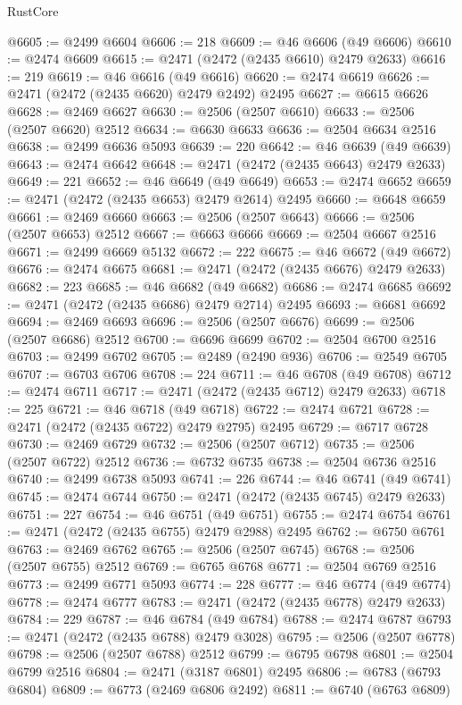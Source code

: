 \begin{lexlean}{RustCore}
\begin{coremodule}
@6605 := @2499 @6604
@6606 := 218
@6609 := @46 @6606 (@49 @6606)
@6610 := @2474 @6609
@6615 := @2471 (@2472 (@2435 @6610) @2479 @2633)
@6616 := 219
@6619 := @46 @6616 (@49 @6616)
@6620 := @2474 @6619
@6626 := @2471 (@2472 (@2435 @6620) @2479 @2492) @2495
@6627 := @6615 @6626
@6628 := @2469 @6627
@6630 := @2506 (@2507 @6610)
@6633 := @2506 (@2507 @6620) @2512
@6634 := @6630 @6633
@6636 := @2504 @6634 @2516
@6638 := @2499 @6636 @5093
@6639 := 220
@6642 := @46 @6639 (@49 @6639)
@6643 := @2474 @6642
@6648 := @2471 (@2472 (@2435 @6643) @2479 @2633)
@6649 := 221
@6652 := @46 @6649 (@49 @6649)
@6653 := @2474 @6652
@6659 := @2471 (@2472 (@2435 @6653) @2479 @2614) @2495
@6660 := @6648 @6659
@6661 := @2469 @6660
@6663 := @2506 (@2507 @6643)
@6666 := @2506 (@2507 @6653) @2512
@6667 := @6663 @6666
@6669 := @2504 @6667 @2516
@6671 := @2499 @6669 @5132
@6672 := 222
@6675 := @46 @6672 (@49 @6672)
@6676 := @2474 @6675
@6681 := @2471 (@2472 (@2435 @6676) @2479 @2633)
@6682 := 223
@6685 := @46 @6682 (@49 @6682)
@6686 := @2474 @6685
@6692 := @2471 (@2472 (@2435 @6686) @2479 @2714) @2495
@6693 := @6681 @6692
@6694 := @2469 @6693
@6696 := @2506 (@2507 @6676)
@6699 := @2506 (@2507 @6686) @2512
@6700 := @6696 @6699
@6702 := @2504 @6700 @2516
@6703 := @2499 @6702
@6705 := @2489 (@2490 @936)
@6706 := @2549 @6705
@6707 := @6703 @6706
@6708 := 224
@6711 := @46 @6708 (@49 @6708)
@6712 := @2474 @6711
@6717 := @2471 (@2472 (@2435 @6712) @2479 @2633)
@6718 := 225
@6721 := @46 @6718 (@49 @6718)
@6722 := @2474 @6721
@6728 := @2471 (@2472 (@2435 @6722) @2479 @2795) @2495
@6729 := @6717 @6728
@6730 := @2469 @6729
@6732 := @2506 (@2507 @6712)
@6735 := @2506 (@2507 @6722) @2512
@6736 := @6732 @6735
@6738 := @2504 @6736 @2516
@6740 := @2499 @6738 @5093
@6741 := 226
@6744 := @46 @6741 (@49 @6741)
@6745 := @2474 @6744
@6750 := @2471 (@2472 (@2435 @6745) @2479 @2633)
@6751 := 227
@6754 := @46 @6751 (@49 @6751)
@6755 := @2474 @6754
@6761 := @2471 (@2472 (@2435 @6755) @2479 @2988) @2495
@6762 := @6750 @6761
@6763 := @2469 @6762
@6765 := @2506 (@2507 @6745)
@6768 := @2506 (@2507 @6755) @2512
@6769 := @6765 @6768
@6771 := @2504 @6769 @2516
@6773 := @2499 @6771 @5093
@6774 := 228
@6777 := @46 @6774 (@49 @6774)
@6778 := @2474 @6777
@6783 := @2471 (@2472 (@2435 @6778) @2479 @2633)
@6784 := 229
@6787 := @46 @6784 (@49 @6784)
@6788 := @2474 @6787
@6793 := @2471 (@2472 (@2435 @6788) @2479 @3028)
@6795 := @2506 (@2507 @6778)
@6798 := @2506 (@2507 @6788) @2512
@6799 := @6795 @6798
@6801 := @2504 @6799 @2516
@6804 := @2471 (@3187 @6801) @2495
@6806 := @6783 (@6793 @6804)
@6809 := @6773 (@2469 @6806 @2492)
@6811 := @6740 (@6763 @6809)

\end{coremodule}
\end{lexlean}
